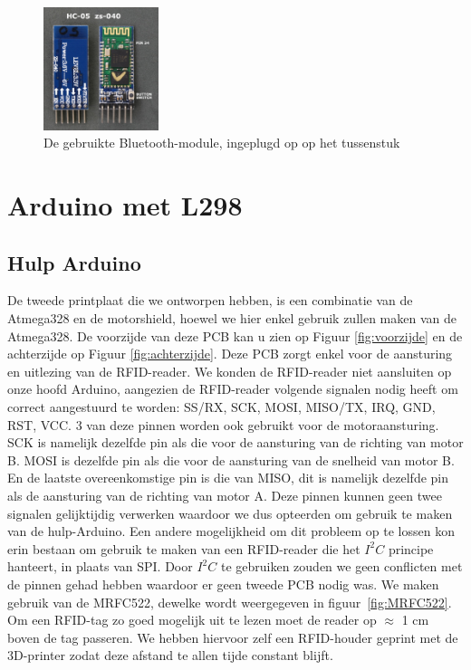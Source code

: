 \begin{figure}[h]
\centering
\includegraphics[width=0.3\textwidth]{HC05.jpg}
\caption{De gebruikte Bluetooth-module, ingeplugd op op het tussenstuk}
\label{fig:HC05}
\end{figure}
\section{Arduino met L298}
\subsection{Hulp Arduino}
De tweede printplaat die we ontworpen hebben, is een combinatie van de Atmega328 en de motorshield, hoewel we hier enkel gebruik zullen maken van de Atmega328. De voorzijde van deze PCB kan u zien op Figuur \ref{fig:voorzijde} en de achterzijde op Figuur \ref{fig:achterzijde}. Deze PCB zorgt enkel voor de aansturing en uitlezing van de RFID-reader. We konden de RFID-reader niet aansluiten op onze hoofd Arduino, aangezien de RFID-reader volgende signalen nodig heeft om correct aangestuurd te worden: SS/RX, SCK, MOSI, MISO/TX, IRQ, GND, RST, VCC. 3 van deze pinnen worden ook gebruikt voor de motoraansturing. SCK is namelijk dezelfde pin als die voor de aansturing van de richting van motor B. MOSI is dezelfde pin als die voor de aansturing van de snelheid van motor B. En de laatste overeenkomstige pin is die van MISO, dit is namelijk dezelfde pin als de aansturing van de richting van motor A. Deze pinnen kunnen geen twee signalen gelijktijdig verwerken waardoor we dus opteerden om gebruik te maken van de hulp-Arduino. Een andere mogelijkheid om dit probleem op te lossen kon erin bestaan om gebruik te maken van een RFID-reader die het $I^{2}C$ principe hanteert, in plaats van SPI. Door $I^{2}C$ te gebruiken zouden we geen conflicten met de pinnen gehad hebben waardoor er geen tweede PCB nodig was. We maken gebruik van de MRFC522, dewelke wordt weergegeven in figuur~\ref{fig:MRFC522}. Om een RFID-tag zo goed mogelijk uit te lezen moet de reader op $\approx$ 1 cm boven de tag passeren. We hebben hiervoor zelf een RFID-houder geprint met de 3D-printer zodat deze afstand te allen tijde constant blijft.

